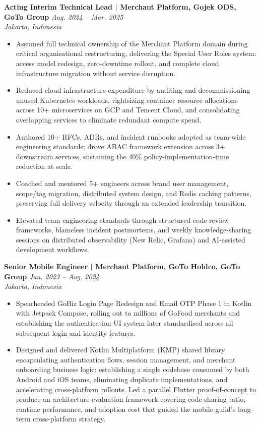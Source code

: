 \documentclass[10pt]{article}
\begin{document}
\vspace{2pt}
\textbf{Acting Interim Technical Lead | Merchant Platform, Gojek ODS, GoTo Group} \hfill \textit{Aug. 2024 -- Mar. 2025}\\
\textit{Jakarta, Indonesia}
\begin{itemize}
\item Assumed full technical ownership of the Merchant Platform domain during critical organisational restructuring, delivering the Special User Roles system: access model redesign, zero-downtime rollout, and complete cloud infrastructure migration without service disruption.
\item Reduced cloud infrastructure expenditure by auditing and decommissioning unused Kubernetes workloads, rightsizing container resource allocations across 10+ microservices on GCP and Tencent Cloud, and consolidating overlapping services to eliminate redundant compute spend.
\item Authored 10+ RFCs, ADRs, and incident runbooks adopted as team-wide engineering standards; drove ABAC framework extension across 3+ downstream services, sustaining the 40\% policy-implementation-time reduction at scale.
\item Coached and mentored 5+ engineers across brand user management, scope/tag migration, distributed system design, and Redis caching patterns, preserving full delivery velocity through an extended leadership transition.
\item Elevated team engineering standards through structured code review frameworks, blameless incident postmortems, and weekly knowledge-sharing sessions on distributed observability (New Relic, Grafana) and AI-assisted development workflows.
\end{itemize}

\vspace{2pt}
\textbf{Senior Mobile Engineer | Merchant Platform, GoTo Holdco, GoTo Group} \hfill \textit{Jan. 2023 -- Aug. 2024}\\
\textit{Jakarta, Indonesia}
\begin{itemize}
\item Spearheaded GoBiz Login Page Redesign and Email OTP Phase 1 in Kotlin with Jetpack Compose, rolling out to millions of GoFood merchants and establishing the authentication UI system later standardised across all subsequent login and identity features.
\item Designed and delivered Kotlin Multiplatform (KMP) shared library encapsulating authentication flows, session management, and merchant onboarding business logic: establishing a single codebase consumed by both Android and iOS teams, eliminating duplicate implementations, and accelerating cross-platform rollouts. Led a parallel Flutter proof-of-concept to produce an architecture evaluation framework covering code-sharing ratio, runtime performance, and adoption cost that guided the mobile guild's long-term cross-platform strategy.
\end{itemize}
\end{document}
